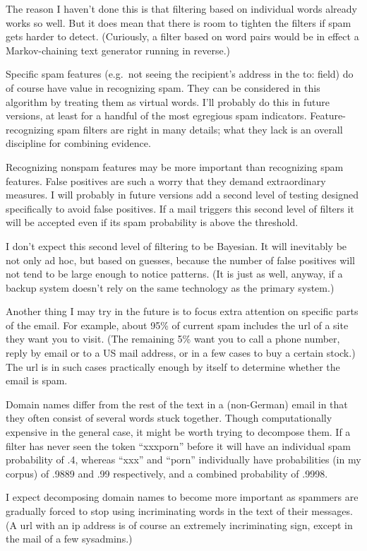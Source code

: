 \documentclass[12pt]{book}
\begin{document}
The reason I haven't done this is that filtering based on individual
words already works so well. But it does mean that there is room to
tighten the filters if spam gets harder to detect. (Curiously, a filter
based on word pairs would be in effect a Markov-chaining text generator
running in reverse.)

Specific spam features (e.g.~not seeing the recipient's address in the
to: field) do of course have value in recognizing spam. They can be
considered in this algorithm by treating them as virtual words. I'll
probably do this in future versions, at least for a handful of the most
egregious spam indicators. Feature-recognizing spam filters are right in
many details; what they lack is an overall discipline for combining
evidence.

Recognizing nonspam features may be more important than recognizing spam
features. False positives are such a worry that they demand
extraordinary measures. I will probably in future versions add a second
level of testing designed specifically to avoid false positives. If a
mail triggers this second level of filters it will be accepted even if
its spam probability is above the threshold.

I don't expect this second level of filtering to be Bayesian. It will
inevitably be not only ad hoc, but based on guesses, because the number
of false positives will not tend to be large enough to notice patterns.
(It is just as well, anyway, if a backup system doesn't rely on the same
technology as the primary system.)

Another thing I may try in the future is to focus extra attention on
specific parts of the email. For example, about 95\% of current spam
includes the url of a site they want you to visit. (The remaining 5\%
want you to call a phone number, reply by email or to a US mail address,
or in a few cases to buy a certain stock.) The url is in such cases
practically enough by itself to determine whether the email is spam.

Domain names differ from the rest of the text in a (non-German) email in
that they often consist of several words stuck together. Though
computationally expensive in the general case, it might be worth trying
to decompose them. If a filter has never seen the token ``xxxporn''
before it will have an individual spam probability of .4, whereas
``xxx'' and ``porn'' individually have probabilities (in my corpus) of
.9889 and .99 respectively, and a combined probability of .9998.

I expect decomposing domain names to become more important as spammers
are gradually forced to stop using incriminating words in the text of
their messages. (A url with an ip address is of course an extremely
incriminating sign, except in the mail of a few sysadmins.)
\end{document}
